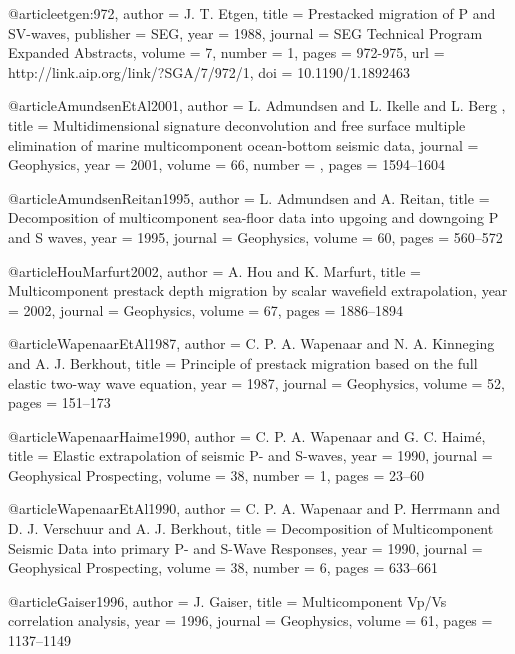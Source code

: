 {@article{etgen:972,
  author =	 {J. T. Etgen},
  title =	 {Prestacked migration of {P} and {S}{V}-waves},
  publisher =	 {SEG},
  year =	 1988,
  journal =	 {SEG Technical Program Expanded Abstracts},
  volume =	 7,
  number =	 1,
  pages =	 {972-975},
  url =		 {http://link.aip.org/link/?SGA/7/972/1},
  doi =		 {10.1190/1.1892463}
}

@article{AmundsenEtAl2001,
author = {L. Admundsen and L. Ikelle and L. Berg },
title = {Multidimensional signature deconvolution and free surface multiple elimination of marine multicomponent ocean-bottom seismic data},
journal = {Geophysics},
year = {2001},
volume = {66},
number = {},
pages = {1594--1604}
}

@article{AmundsenReitan1995,
  author =	 {L. Admundsen and A. Reitan},
  title =	 {Decomposition of multicomponent sea-floor data into
                  upgoing and downgoing {P} and {S} waves},
  year =	 1995,
  journal =	 {Geophysics},
  volume =	 60,
  pages =	 {560--572}
}

@article{HouMarfurt2002,
  author =	 {A. Hou and K. Marfurt},
  title =	 {Multicomponent prestack depth migration by scalar
                  wavefield extrapolation},
  year =	 2002,
  journal =	 {Geophysics},
  volume =	 67,
  pages =	 {1886--1894}
}

@article{WapenaarEtAl1987,
  author =	 {C. P. A. Wapenaar and N. A. Kinneging and
                  A. J. Berkhout},
  title =	 {Principle of prestack migration based on the full
                  elastic two-way wave equation},
  year =	 1987,
  journal =	 {Geophysics},
  volume =	 52,
  pages =	 {151--173}
}

@article{WapenaarHaime1990,
  author =	 {C. P. A. Wapenaar and G. C. Haim\'{e}},
  title =	 {Elastic extrapolation of seismic {P}- and {S}-waves},
  year =	 1990,
  journal =	 {Geophysical Prospecting},
  volume =	 38,
  number =	 1,
  pages =	 {23--60}
}

@article{WapenaarEtAl1990,
  author =	 {C. P. A. Wapenaar and P. Herrmann and
                  D. J. Verschuur and A. J. Berkhout},
  title =	 {Decomposition of Multicomponent Seismic Data into
                  primary {P}- and {S}-Wave Responses},
  year =	 1990,
  journal =	 {Geophysical Prospecting},
  volume =	 38,
  number =	 6,
  pages =	 {633--661}
}

@article{Gaiser1996,
  author =	 {J. Gaiser},
  title =	 {Multicomponent {V}p/{V}s correlation analysis},
  year =	 1996,
  journal =	 {Geophysics},
  volume =	 61,
  pages =	 {1137--1149}
}

}
